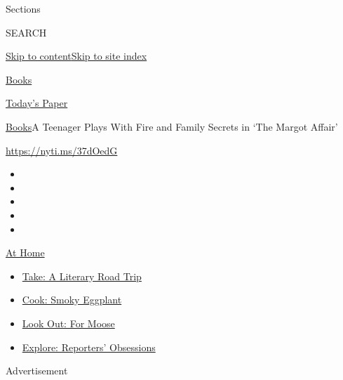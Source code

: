Sections

SEARCH

\protect\hyperlink{site-content}{Skip to
content}\protect\hyperlink{site-index}{Skip to site index}

\href{https://www.nytimes.com/section/books}{Books}

\href{https://myaccount.nytimes.com/auth/login?response_type=cookie\&client_id=vi}{}

\href{https://www.nytimes.com/section/todayspaper}{Today's Paper}

\href{/section/books}{Books}\textbar{}A Teenager Plays With Fire and
Family Secrets in `The Margot Affair'

\url{https://nyti.ms/37dOedG}

\begin{itemize}
\item
\item
\item
\item
\item
\end{itemize}

\href{https://www.nytimes.com/spotlight/at-home?action=click\&pgtype=Article\&state=default\&region=TOP_BANNER\&context=at_home_menu}{At
Home}

\begin{itemize}
\tightlist
\item
  \href{https://www.nytimes.com/2020/07/28/books/time-for-a-literary-road-trip.html?action=click\&pgtype=Article\&state=default\&region=TOP_BANNER\&context=at_home_menu}{Take:
  A Literary Road Trip}
\item
  \href{https://www.nytimes.com/2020/07/29/magazine/bored-with-your-home-cooking-some-smoky-eggplant-will-fix-that.html?action=click\&pgtype=Article\&state=default\&region=TOP_BANNER\&context=at_home_menu}{Cook:
  Smoky Eggplant}
\item
  \href{https://www.nytimes.com/2020/07/27/travel/moose-michigan-isle-royale.html?action=click\&pgtype=Article\&state=default\&region=TOP_BANNER\&context=at_home_menu}{Look
  Out: For Moose}
\item
  \href{https://www.nytimes.com/interactive/2020/at-home/even-more-reporters-editors-diaries-lists-recommendations.html?action=click\&pgtype=Article\&state=default\&region=TOP_BANNER\&context=at_home_menu}{Explore:
  Reporters' Obsessions}
\end{itemize}

Advertisement

